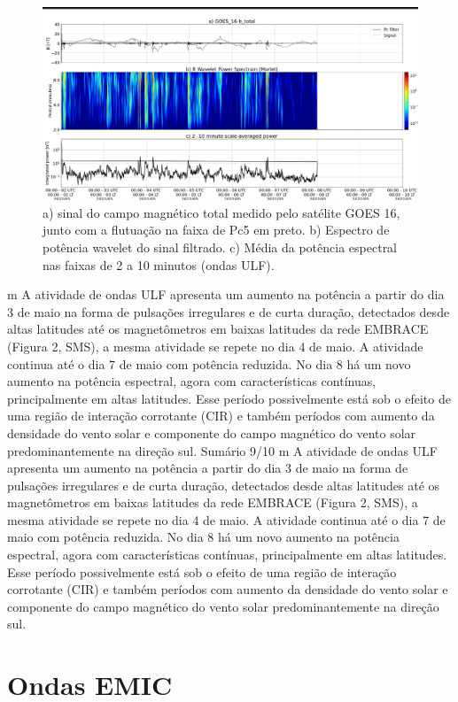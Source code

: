 \documentclass[a4paper, 10pt]{article}
\begin{document}
                     \begin{figure}[H]
    
                        \centering
   
                             \includegraphics[width=14cm]{./figures//figureULF_2.png}

                             \caption{a) sinal do campo magnético total medido pelo 
                              satélite GOES 16, junto com a flutuação na faixa de Pc5 
                              em preto. b) Espectro de potência wavelet do sinal 
                              filtrado. c) Média da potência espectral nas faixas 
                              de 2 a 10 minutos (ondas ULF).}
                        \end{figure}

                     m A atividade de ondas ULF apresenta um aumento na potência a partir do
dia 3 de maio na forma de pulsações irregulares e de curta duração,
detectados desde altas latitudes até os magnetômetros em baixas latitudes
da rede EMBRACE (Figura 2, SMS), a mesma atividade se repete no dia 4 de
maio. A atividade continua até o dia 7 de maio com potência reduzida. No
dia 8 há um novo aumento na potência espectral, agora com características
contínuas, principalmente em altas latitudes. Esse período possivelmente
está sob o efeito de uma região de interação corrotante (CIR) e também
períodos com aumento da densidade do vento solar e componente do
campo magnético do vento solar predominantemente na direção sul.
Sumário
9/10
m A atividade de ondas ULF apresenta um aumento na potência a partir do dia 3 de maio na forma de pulsações irregulares e de curta duração, detectados desde altas latitudes até os magnetômetros em baixas latitudes da rede EMBRACE (Figura 2, SMS), a mesma atividade se repete no dia 4 de maio. A atividade continua até o dia 7 de maio com potência reduzida. No dia 8 há um novo aumento na potência espectral, agora com características contínuas, principalmente em altas latitudes. Esse período possivelmente está sob o efeito de uma região de interação corrotante (CIR) e também períodos com aumento da densidade do vento solar e componente do campo magnético do vento solar predominantemente na direção sul.\section{Ondas EMIC} 
\end{document}
